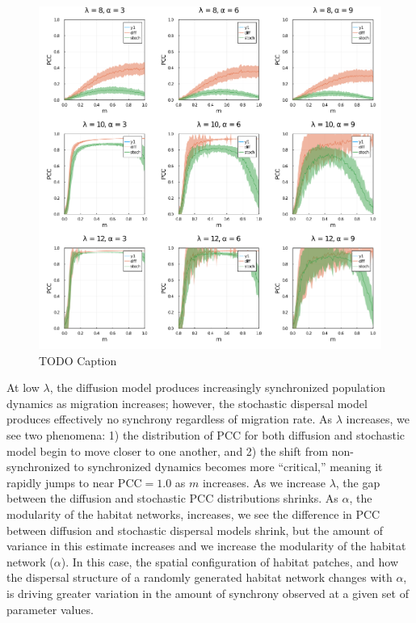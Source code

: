 \documentclass[10pt,oneside]{article}
\makeatletter
\def\maxwidth{\ifdim\Gin@nat@width>\linewidth\linewidth
\else\Gin@nat@width\fi}
\let\Oldincludegraphics\includegraphics
\renewcommand{\includegraphics}[1]{\Oldincludegraphics[width=\maxwidth]{#1}}
\makeatother
\begin{document}
\begin{figure}
\hypertarget{fig:migration_gradient}{%
\centering
\includegraphics{./figures/migration_gradient_panels.png}
\caption{TODO Caption}\label{fig:migration_gradient}
}
\end{figure}

At low \(\lambda\), the diffusion model produces increasingly
synchronized population dynamics as migration increases; however, the
stochastic dispersal model produces effectively no synchrony regardless
of migration rate. As \(\lambda\) increases, we see two phenomena: 1)
the distribution of \(\text{PCC}\) for both diffusion and stochastic
model begin to move closer to one another, and 2) the shift from
non-synchronized to synchronized dynamics becomes more ``critical,''
meaning it rapidly jumps to near \(\text{PCC}=1.0\) as \(m\) increases.
As we increase \(\lambda\), the gap between the diffusion and stochastic
PCC distributions shrinks. As \(\alpha\), the modularity of the habitat
networks, increases, we see the difference in PCC between diffusion and
stochastic dispersal models shrink, but the amount of variance in this
estimate increases and we increase the modularity of the habitat network
(\(\alpha\)). In this case, the spatial configuration of habitat
patches, and how the dispersal structure of a randomly generated habitat
network changes with \(\alpha\), is driving greater variation in the
amount of synchrony observed at a given set of parameter values.
\end{document}

